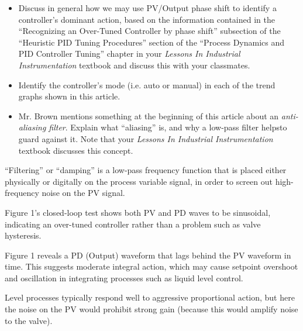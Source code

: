 \begin{itemize}
\item{} Discuss in general how we may use PV/Output phase shift to identify a controller's dominant action, based on the information contained in the ``Recognizing an Over-Tuned Controller by phase shift'' subsection of the ``Heuristic PID Tuning Procedures'' section of the ``Process Dynamics and PID Controller Tuning'' chapter in your {\it Lessons In Industrial Instrumentation} textbook and discuss this with your classmates.
\item{} Identify the controller's mode (i.e. auto or manual) in each of the trend graphs shown in this article.
\item{} Mr. Brown mentions something at the beginning of this article about an {\it anti-aliasing filter}.  Explain what ``aliasing'' is, and why a low-pass filter helpsto guard against it.  Note that your {\it Lessons In Industrial Instrumentation} textbook discusses this concept.
\end{itemize}







``Filtering'' or ``damping'' is a low-pass frequency function that is placed either physically or digitally on the process variable signal, in order to screen out high-frequency noise on the PV signal.







Figure 1's closed-loop test shows both PV and PD waves to be sinusoidal, indicating an over-tuned controller rather than a problem such as valve hysteresis.

\vskip 10pt

Figure 1 reveals a PD (Output) waveform that lags behind the PV waveform in time.  This suggests moderate integral action, which may cause setpoint overshoot and oscillation in integrating processes such as liquid level control.

\vskip 10pt

Level processes typically respond well to aggressive proportional action, but here the noise on the PV would prohibit strong gain (because this would amplify noise to the valve).  

\vskip 10pt

